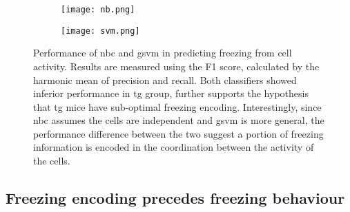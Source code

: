 \begin{figure}[h]
    \begin{subfigure}[h]{\textwidth}
        \texttt{[image: nb.png]}
        \caption{\label{f.ad.nb}}
    \end{subfigure}
    \begin{subfigure}[h]{\textwidth}
        \texttt{[image: svm.png]}
        \caption{\label{f.ad.svm}}
    \end{subfigure}
    \caption{Performance of  \gls{nbc} and  \gls{gsvm} in predicting freezing from cell activity. Results are measured  using the F1 score, calculated by the harmonic mean of precision and recall. Both classifiers showed inferior performance in \gls{tg} group, further supports the hypothesis that \gls{tg} mice have sub-optimal freezing encoding. Interestingly, since \gls{nbc} assumes the cells are independent and \gls{gsvm} is more general, the performance difference between the two suggest a portion of freezing information is encoded in the coordination between the activity of the cells. \label{f.ad.classifier}}
\end{figure}


\subsection{Freezing encoding precedes freezing behaviour}


